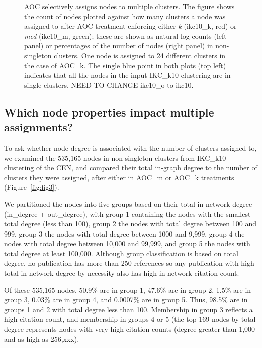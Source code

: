 \documentclass[12pt, oneside]{article}   	%
\begin{document}
\begin{figure}[H]
\begin{subfigure}[t]{0.48\textwidth}
    	\end{subfigure}
\captionsetup{width=0.9\textwidth}	
\caption{AOC selectively assigns nodes to multiple clusters. The figure shows the count of nodes plotted against how many clusters a node was assigned to after AOC treatment enforcing either \emph{k} (ikc10\_k, red) or \emph{mcd} (ikc10\_m, green);  these are shown as natural log counts (left panel) or percentages of the number of nodes (right panel) in non-singleton clusters. One node is assigned to 24 different clusters in the case of AOC\_k. The single blue point in both plots (top left) indicates that all the nodes in the input IKC\_k10 clustering are in single clusters. NEED TO CHANGE ikc10\_o to ikc10.}
\label{fig:fig2}
\end{figure}

\subsection{Which node properties impact multiple assignments?}

To ask whether node degree is associated with the number of clusters assigned to, we examined the 535,165 nodes in non-singleton clusters  from IKC\_k10 clustering of the CEN, and compared their total in-graph degree to the number of clusters they were assigned, after either in AOC\_m or AOC\_k treatments (Figure~\ref{fig:fig3}). 

We partitioned the nodes into five groups based on their total in-network degree (in\_degree + out\_degree),  with group 1 containing the nodes with the smallest total degree (less than 100), group 2 the nodes with total degree between 100 and 999, group 3 the nodes with total degree between 1000 and 9,999, 
group 4 the nodes with total degree between 10,000 and 99,999, and group 5 the nodes with total degree at least 100,000.
Although group classification is based on total degree, no publication has more than 250 references so any publication with high total 
in-network degree by necessity also has high  in-network citation count. 

Of these 535,165 nodes, 50.9\% are  in group 1, 47.6\% are in group  2, 1.5\% are in group 3,  0.03\% are in group 4, and 0.0007\% are in group 5.
Thus, 98.5\% are in groups 1 and 2 with total degree less than 100. Membership in group 3  reflects a high citation count, and membership
in groups 4 or 5 (the top 169 nodes by total degree represents nodes with very high citation counts (degree greater than 1,000 and as high as 256,xxx).
\end{document}
